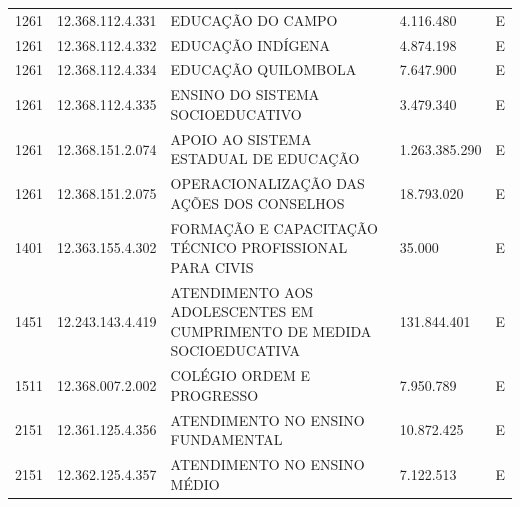 \documentclass{article}
\begin{document}
\begin{longtable}[c]{m{1cm}|m{2cm}|m{10cm}|m{2cm}|m{1cm}}
\multicolumn{1}{C{1cm}|}{1261} & \multicolumn{1}{C{2cm}|}{12.368.112.4.331} & \multicolumn{1}{L{10cm}|}{EDUCAÇÃO DO CAMPO} & \multicolumn{1}{R{2cm}|}{4.116.480} & \multicolumn{1}{C{1cm}}{E} \\
\multicolumn{1}{C{1cm}|}{1261} & \multicolumn{1}{C{2cm}|}{12.368.112.4.332} & \multicolumn{1}{L{10cm}|}{EDUCAÇÃO INDÍGENA} & \multicolumn{1}{R{2cm}|}{4.874.198} & \multicolumn{1}{C{1cm}}{E} \\
\multicolumn{1}{C{1cm}|}{1261} & \multicolumn{1}{C{2cm}|}{12.368.112.4.334} & \multicolumn{1}{L{10cm}|}{EDUCAÇÃO QUILOMBOLA} & \multicolumn{1}{R{2cm}|}{7.647.900} & \multicolumn{1}{C{1cm}}{E} \\
\multicolumn{1}{C{1cm}|}{1261} & \multicolumn{1}{C{2cm}|}{12.368.112.4.335} & \multicolumn{1}{L{10cm}|}{ENSINO DO SISTEMA SOCIOEDUCATIVO} & \multicolumn{1}{R{2cm}|}{3.479.340} & \multicolumn{1}{C{1cm}}{E} \\
\multicolumn{1}{C{1cm}|}{1261} & \multicolumn{1}{C{2cm}|}{12.368.151.2.074} & \multicolumn{1}{L{10cm}|}{APOIO AO SISTEMA ESTADUAL DE EDUCAÇÃO} & \multicolumn{1}{R{2cm}|}{1.263.385.290} & \multicolumn{1}{C{1cm}}{E} \\
\multicolumn{1}{C{1cm}|}{1261} & \multicolumn{1}{C{2cm}|}{12.368.151.2.075} & \multicolumn{1}{L{10cm}|}{OPERACIONALIZAÇÃO DAS AÇÕES DOS CONSELHOS} & \multicolumn{1}{R{2cm}|}{18.793.020} & \multicolumn{1}{C{1cm}}{E} \\
\multicolumn{1}{C{1cm}|}{1401} & \multicolumn{1}{C{2cm}|}{12.363.155.4.302} & \multicolumn{1}{L{10cm}|}{FORMAÇÃO E CAPACITAÇÃO TÉCNICO PROFISSIONAL PARA CIVIS} & \multicolumn{1}{R{2cm}|}{35.000} & \multicolumn{1}{C{1cm}}{E} \\
\multicolumn{1}{C{1cm}|}{1451} & \multicolumn{1}{C{2cm}|}{12.243.143.4.419} & \multicolumn{1}{L{10cm}|}{ATENDIMENTO AOS ADOLESCENTES EM CUMPRIMENTO DE MEDIDA SOCIOEDUCATIVA} & \multicolumn{1}{R{2cm}|}{131.844.401} & \multicolumn{1}{C{1cm}}{E} \\
\multicolumn{1}{C{1cm}|}{1511} & \multicolumn{1}{C{2cm}|}{12.368.007.2.002} & \multicolumn{1}{L{10cm}|}{COLÉGIO ORDEM E PROGRESSO} & \multicolumn{1}{R{2cm}|}{7.950.789} & \multicolumn{1}{C{1cm}}{E} \\
\multicolumn{1}{C{1cm}|}{2151} & \multicolumn{1}{C{2cm}|}{12.361.125.4.356} & \multicolumn{1}{L{10cm}|}{ATENDIMENTO NO ENSINO FUNDAMENTAL} & \multicolumn{1}{R{2cm}|}{10.872.425} & \multicolumn{1}{C{1cm}}{E} \\
\multicolumn{1}{C{1cm}|}{2151} & \multicolumn{1}{C{2cm}|}{12.362.125.4.357} & \multicolumn{1}{L{10cm}|}{ATENDIMENTO NO ENSINO MÉDIO} & \multicolumn{1}{R{2cm}|}{7.122.513} & \multicolumn{1}{C{1cm}}{E} \\

\end{longtable}
\end{document}
